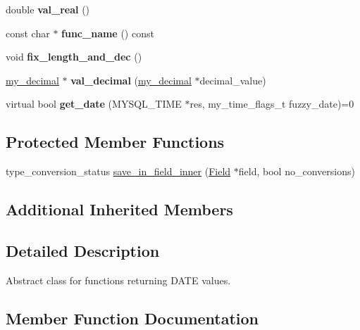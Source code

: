 \begin{DoxyCompactItemize}
\item 
\mbox{\label{classItem__date__func_a5e4db142a061f57d20a14dcae4f4312b}} 
double {\bfseries val\+\_\+real} ()
\item 
\mbox{\label{classItem__date__func_a517f6081f12c33a42c01f2dd8fc7797b}} 
const char $\ast$ {\bfseries func\+\_\+name} () const
\item 
\mbox{\label{classItem__date__func_a22e0a9075eb28c41ae64dcb2a2998eb0}} 
void {\bfseries fix\+\_\+length\+\_\+and\+\_\+dec} ()
\item 
\mbox{\label{classItem__date__func_ad3b2c97cd5099548bb1a83a566337e6d}} 
\mbox{\hyperlink{classmy__decimal}{my\+\_\+decimal}} $\ast$ {\bfseries val\+\_\+decimal} (\mbox{\hyperlink{classmy__decimal}{my\+\_\+decimal}} $\ast$decimal\+\_\+value)
\item 
\mbox{\label{classItem__date__func_a37701f58aa0848dcae29f0ab65a74553}} 
virtual bool {\bfseries get\+\_\+date} (M\+Y\+S\+Q\+L\+\_\+\+T\+I\+ME $\ast$res, my\+\_\+time\+\_\+flags\+\_\+t fuzzy\+\_\+date)=0
\end{DoxyCompactItemize}
\subsection*{Protected Member Functions}
\begin{DoxyCompactItemize}
\item 
type\+\_\+conversion\+\_\+status \mbox{\hyperlink{classItem__date__func_a4fe0277927df0b5012658ebc76717f17}{save\+\_\+in\+\_\+field\+\_\+inner}} (\mbox{\hyperlink{classField}{Field}} $\ast$field, bool no\+\_\+conversions)
\end{DoxyCompactItemize}
\subsection*{Additional Inherited Members}


\subsection{Detailed Description}
Abstract class for functions returning D\+A\+TE values. 

\subsection{Member Function Documentation}
\mbox{\label{classItem__date__func_a4fe0277927df0b5012658ebc76717f17}} 
